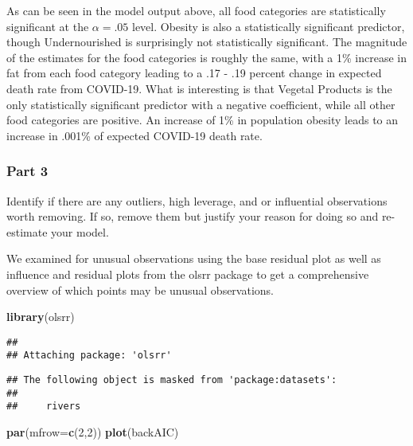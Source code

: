 \documentclass[
]{article}
\newenvironment{Shaded}{\begin{snugshade}}{\end{snugshade}}
\newcommand{\DataTypeTok}[1]{\textcolor[rgb]{0.13,0.29,0.53}{#1}}
\newcommand{\DecValTok}[1]{\textcolor[rgb]{0.00,0.00,0.81}{#1}}
\newcommand{\KeywordTok}[1]{\textcolor[rgb]{0.13,0.29,0.53}{\textbf{#1}}}
\newcommand{\NormalTok}[1]{#1}
\begin{document}
As can be seen in the model output above, all food categories are
statistically significant at the \(\alpha = .05\) level. Obesity is also
a statistically significant predictor, though Undernourished is
surprisingly not statistically significant. The magnitude of the
estimates for the food categories is roughly the same, with a 1\%
increase in fat from each food category leading to a .17 - .19 percent
change in expected death rate from COVID-19. What is interesting is that
Vegetal Products is the only statistically significant predictor with a
negative coefficient, while all other food categories are positive. An
increase of 1\% in population obesity leads to an increase in .001\% of
expected COVID-19 death rate.

\hypertarget{part-3}{%
\subsubsection{Part 3}\label{part-3}}

Identify if there are any outliers, high leverage, and or influential
observations worth removing. If so, remove them but justify your reason
for doing so and re-estimate your model.

We examined for unusual observations using the base residual plot as
well as influence and residual plots from the olsrr package to get a
comprehensive overview of which points may be unusual observations.

\begin{Shaded}
\begin{Highlighting}[]
\KeywordTok{library}\NormalTok{(olsrr)}
\end{Highlighting}
\end{Shaded}

\begin{verbatim}
## 
## Attaching package: 'olsrr'
\end{verbatim}

\begin{verbatim}
## The following object is masked from 'package:datasets':
## 
##     rivers
\end{verbatim}

\begin{Shaded}
\begin{Highlighting}[]
\KeywordTok{par}\NormalTok{(}\DataTypeTok{mfrow=}\KeywordTok{c}\NormalTok{(}\DecValTok{2}\NormalTok{,}\DecValTok{2}\NormalTok{))}
\KeywordTok{plot}\NormalTok{(backAIC)}
\end{Highlighting}
\end{Shaded}
\end{document}
